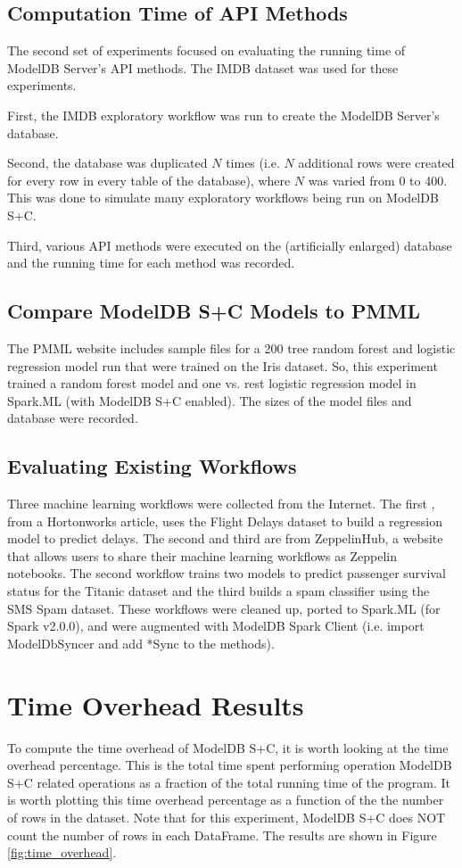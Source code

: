 \subsection{Computation Time of API Methods}
The second set of experiments focused on evaluating the running time of ModelDB Server's API methods. The
IMDB dataset was used for these experiments.

First, the IMDB exploratory workflow was run to create the ModelDB Server's database.

Second, the database was duplicated $N$ times (i.e. $N$ additional rows were created for
every row in every table of the database), where $N$ was varied from 0 to 400. This was
done to simulate many exploratory workflows being run on ModelDB S+C.

Third, various API methods were executed on the (artificially enlarged) database and the
running time for each method was recorded.

\subsection{Compare ModelDB S+C Models to PMML}
The PMML website \cite{pmmlwebsite} includes sample files for a 200 tree random forest
and logistic regression model run that were trained on the Iris dataset. So, this
experiment trained a random forest model and one vs. rest logistic regression model
in Spark.ML (with ModelDB S+C enabled). The sizes of the model files and database
were recorded.

\subsection{Evaluating Existing Workflows}
Three machine learning workflows were collected from the Internet. The first \cite{flightworkflow}, from
a Hortonworks article, uses the Flight Delays dataset to build a regression model to predict
delays. The second \cite{titanicworkflow} and third \cite{spamworkflow} are from ZeppelinHub, a website that allows users to share their
machine learning workflows as Zeppelin notebooks. The second workflow trains two models
to predict passenger survival status for the Titanic dataset and the third builds a spam classifier
using the SMS Spam dataset. These workflows were cleaned up, ported to Spark.ML (for Spark v2.0.0), and 
were augmented with ModelDB Spark Client (i.e. import ModelDbSyncer and add *Sync to the methods).

\section{Time Overhead Results}
To compute the time overhead of ModelDB S+C, it is worth looking at the time overhead percentage. This
is the total time spent performing operation ModelDB S+C related operations as a fraction of the total
running time of the program. It is worth plotting this time overhead percentage as a function of the
the number of rows in the dataset. Note that for this experiment, ModelDB S+C does NOT 
count the number of rows in each DataFrame. The results are shown in Figure \ref{fig:time_overhead}.

